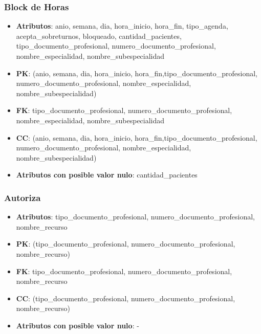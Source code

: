 \documentclass[a4paper,11pt]{article}
\begin{document}
\subsubsection{\textbf{Block de Horas}}

\begin{itemize}

\item 
\textbf{Atributos}:  anio, semana, dia, hora\_inicio, hora\_fin, tipo\_agenda, acepta\_sobreturnos,  bloqueado, cantidad\_pacientes, tipo\_documento\_profesional, numero\_documento\_profesional, nombre\_especialidad, nombre\_subespecialidad

\item 
\textbf{PK}: (anio, semana, dia, hora\_inicio, hora\_fin,tipo\_documento\_profesional, numero\_documento\_profesional, nombre\_especialidad, nombre\_subespecialidad)

\item
\textbf{FK}:  tipo\_documento\_profesional, numero\_documento\_profesional, nombre\_especialidad, nombre\_subespecialidad

\item 
\textbf{CC}: (anio, semana, dia, hora\_inicio, hora\_fin,tipo\_documento\_profesional, numero\_documento\_profesional, nombre\_especialidad, nombre\_subespecialidad)

\item 
\textbf{Atributos con posible valor nulo}: cantidad\_pacientes

\end{itemize}
\subsubsection{\textbf{Autoriza}}

\begin{itemize}

\item 
\textbf{Atributos}: tipo\_documento\_profesional, numero\_documento\_profesional, nombre\_recurso

\item 
\textbf{PK}: (tipo\_documento\_profesional, numero\_documento\_profesional, nombre\_recurso)

\item
\textbf{FK}: tipo\_documento\_profesional, numero\_documento\_profesional, nombre\_recurso

\item 
\textbf{CC}: (tipo\_documento\_profesional, numero\_documento\_profesional, nombre\_recurso)

\item 
\textbf{Atributos con posible valor nulo}: -

\end{itemize}
\end{document}
